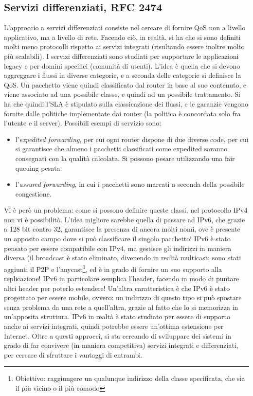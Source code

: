 \subsection{Servizi differenziati, RFC 2474}
L'approccio a servizi differenziati consiste nel cercare di fornire QoS non a livello applicativo, ma a livello di 
rete. Facendo ciò, in realtà, si ha che si sono definiti molti meno protocolli rispetto ai servizi integrati 
(risultando essere inoltre molto più scalabili). I servizi differenziati sono studiati per supportare le applicazioni
legacy e per domini specifici (comunità di utenti). L'idea è quella che si devono aggreggare i flussi in diverse
categorie, e a seconda delle categorie si definisce la QoS. Un pacchetto viene quindi classificato dal router in base al
suo contenuto, e viene associato ad una possibile classe, e quindi ad un possibile trattamento.
Si ha che quindi l'SLA è stipulato sulla classicazione dei flussi, e le garanzie vengono fornite dalle politiche
implementate dai router (la politica è concordata solo fra l'utente e il server).
Possibili esempi di servizio sono:
\begin{itemize}
 \item l'\textit{expedited forwarding}, per cui ogni router dispone di due diverse code, per cui si garantisce che
 almeno i pacchetti classificati come expedited saranno consegnati con la qualità calcolata. Si possono pesare
 utilizzando una fair queuing pesata.
 \item l'\textit{assured forwarding}, in cui i pacchetti sono marcati a seconda della possibile congestione.
\end{itemize}
Vi è però un problema: come si possono definire queste classi, nel protocollo IPv4 non vi è possibilità. L'idea 
migliore sarebbe quella di passare ad IPv6, che grazie a 128 bit contro 32, garantisce la presenza di ancora molti 
nomi, ove è presente un apposito campo dove si può classificare il singolo pacchetto!
IPv6 è stato pensato per essere compatibile con IPv4, ma gestisce gli indirizzi in maniera diversa (il broadcast è 
stato eliminato, divenendo in realtà multicast; sono stati aggiunti il P2P e l'anycast\footnote{Obiettivo: raggiungere
un qualunque indirizzo della classe specificata, che sia il più vicino o il più comodo}, ed è in grado di fornire un
suo supporto alla replicazione! IPv6 in particolare semplica l'header, facendo in modo di puntare altri header per
poterlo estendere! Un'altra caratteristica è che IPv6 è stato progettato per essere mobile, ovvero: un indirizzo di
questo tipo si può spostare senza problema da una rete a quell'altra, grazie al fatto che lo si memorizza in 
un'apposita struttura. IPv6 in realtà è stato studiato per essere di supporto anche ai servizi integrati, quindi
potrebbe essere un'ottima estensione per Internet.
Oltre a questi approcci, si sta cercando di sviluppare dei sistemi in grado di far convivere (in maniera competitiva)
servizi integrati e differenziati, per cercare di sfruttare i vantaggi di entrambi.